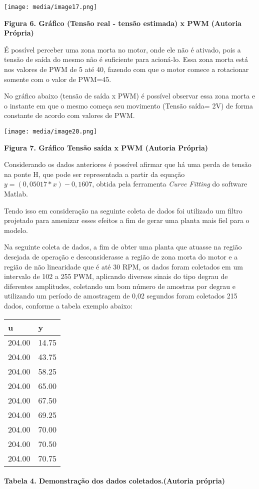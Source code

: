 \documentclass[]{article}
\let\oldparagraph\paragraph
\renewcommand{\paragraph}[1]{\oldparagraph{#1}\mbox{}}
\begin{document}
\texttt{[image: media/image17.png]}

\textbf{Figura 6. Gráfico (Tensão real - tensão estimada) x PWM (Autoria
Própria)}

É possível perceber uma zona morta no motor, onde ele não é ativado,
pois a tensão de saída do mesmo não é suficiente para acioná-lo. Essa
zona morta está nos valores de PWM de 5 até 40, fazendo com que o motor
comece a rotacionar somente com o valor de PWM=45.

No gráfico abaixo (tensão de saída x PWM) é possível observar essa zona
morta e o instante em que o mesmo começa seu movimento (Tensão saída=
2V) de forma constante de acordo com valores de PWM.

\texttt{[image: media/image20.png]}

\textbf{Figura 7. Gráfico Tensão saída x PWM (Autoria Própria)}

Considerando os dados anteriores é possível afirmar que há uma perda de
tensão na ponte H, que pode ser representada a partir da equação
\(y = (0,05017*x) - 0,1607\), obtida pela ferramenta \emph{Curve
Fitting} do software Matlab.

Tendo isso em consideração na seguinte coleta de dados foi utilizado um
filtro projetado para amenizar esses efeitos a fim de gerar uma planta
mais fiel para o modelo.

Na seguinte coleta de dados, a fim de obter uma planta que atuasse na
região desejada de operação e desconsiderasse a região de zona morta do
motor e a região de não linearidade que é até 30 RPM, os dados foram
coletados em um intervalo de 102 a 255 PWM, aplicando diversos sinais do
tipo degrau de diferentes amplitudes, coletando um bom número de
amostras por degrau e utilizando um período de amostragem de 0,02
segundos foram coletados 215 dados, conforme a tabela exemplo abaixo:

\begin{longtable}[]{@{}ll@{}}
\toprule
u & y\tabularnewline
\midrule
\endhead
204.00 & 14.75\tabularnewline
204.00 & 43.75\tabularnewline
204.00 & 58.25\tabularnewline
204.00 & 65.00\tabularnewline
204.00 & 67.50\tabularnewline
204.00 & 69.25\tabularnewline
204.00 & 70.00\tabularnewline
204.00 & 70.50\tabularnewline
204.00 & 70.75\tabularnewline
\bottomrule
\end{longtable}

\paragraph{Tabela 4. Demonstração dos dados coletados.(Autoria própria)
}\label{tabela-4.-demonstrauxe7uxe3o-dos-dados-coletados.autoria-pruxf3pria}
\end{document}
